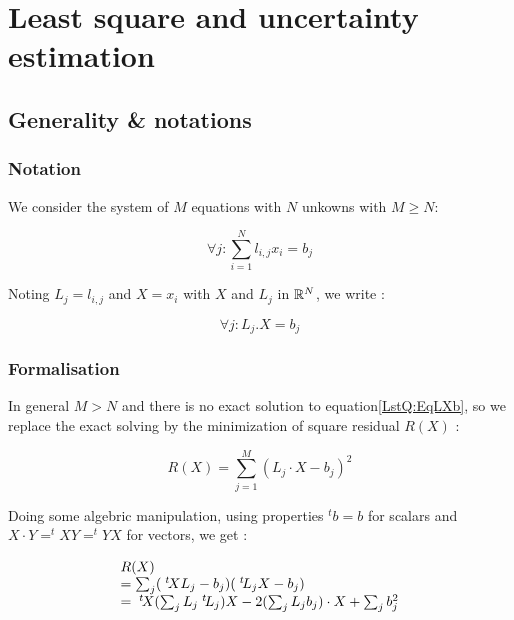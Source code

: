 \chapter{Least square and uncertainty estimation}
\label{Chap:LeastSquare}


\section{Generality \& notations}

\subsection{Notation}

We consider the system of $M$ equations with $N$ unkowns with $M\geq N$:

\begin{equation}
	\forall j : \sum_{i=1}^N l_{i,j} x_i = b_j
\end{equation}

Noting $L_j =  l_{i,j}$ and $X=x_i$ with $X$ and $L_j$ in $\mathbb{R}^N$, we write :

\begin{equation}
	\forall j :  L_j . X = b_j \label{LstQ:EqLXb}
\end{equation}

\subsection{Formalisation}

In general $M>N$ and there is no exact solution to equation\ref{LstQ:EqLXb},
so we replace the exact solving by the minimization of square residual $R(X)$ :


\begin{equation}
	R(X)  =  \sum_{j=1}^M (L_j \cdot X - b_j)^2
\end{equation}

Doing some algebric manipulation, using properties $^t b= b$ for scalars and $X \cdot Y= ^t X Y = ^t Y X$ for vectors, we get :

\begin{equation}
\begin{array}{l}
	R(X)  \\
         =  \sum_j  (\; ^{t} \! X L_j -b_j)  ( \; ^{t} \! L_j  X -b_j) \\
	 = \; ^{t} \! X  (\sum_j L_j  \; ^{t} \! L_j) X - 2 (\sum_j L_j b_j) \cdot X + \sum_j b_j ^2
\end{array}
\end{equation}

